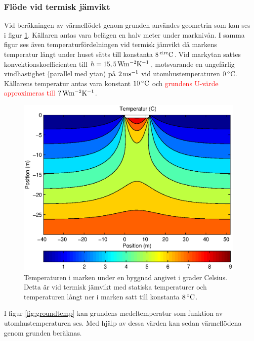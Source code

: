 \subsubsection{Flöde vid termisk jämvikt}

Vid beräkningen av värmeflödet genom grunden användes geometrin som kan ses i figur \ref{fig:groundheat}. Källaren antas vara belägen en halv meter under marknivån. I samma figur ses även temperaturfördelningen vid termisk jämvikt då markens temperatur långt under huset sätts till konstanta $\unit[8]{^{circ}C}$. Vid markytan sattes konvektionskoefficienten till $h=\unit[15,5]{Wm^{-2}K^{-1}}$, motsvarande en ungefärlig vindhastighet (parallel med ytan) på $\unit[2]{ms^{-1}}$ vid utomhustemperaturen $\unit[0]{^{\circ}C}$. Källarens temperatur antas vara konstant $\unit[10]{^{\circ}C}$ och \textcolor{red}{grundens U-värde approximeras till $\unit[?]{Wm^{-2}K^{-1}}$}.

\begin{figure}
\centering
\includegraphics{images/groundheat.eps}
\caption{\label{fig:groundheat}Temperaturen i marken under en byggnad angivet i grader Celsius. Detta är vid termisk jämvikt med statiska temperaturer och temperaturen långt ner i marken satt till konstanta $\unit[8]{^\circ C}$.}
\end{figure}

I figur \ref{fig:groundtemp} kan grundens medeltemperatur som funktion av utomhustemperaturen ses. Med hjälp av dessa värden kan sedan värmeflödena genom grunden beräknas.

